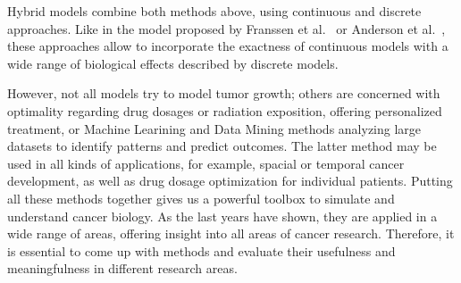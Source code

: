 Hybrid models combine both methods above, using continuous and discrete approaches. Like in the model proposed by Franssen et al.~\cite{franssen_mathematical_2019} or Anderson et al.~\cite{anderson_continuous_1998}, these approaches allow to incorporate the exactness of continuous models with a wide range of biological effects described by discrete models.

However, not all models try to model tumor growth; others are concerned with optimality regarding drug dosages or radiation exposition, offering personalized treatment, or Machine Learining and Data Mining methods analyzing large datasets to identify patterns and predict outcomes. The latter method may be used in all kinds of applications, for example, spacial or temporal cancer development, as well as drug dosage optimization for individual patients. Putting all these methods together gives us a powerful toolbox to simulate and understand cancer biology. As the last years have shown, they are applied in a wide range of areas, offering insight into all areas of cancer research. Therefore, it is essential to come up with methods and evaluate their usefulness and meaningfulness in different research areas.